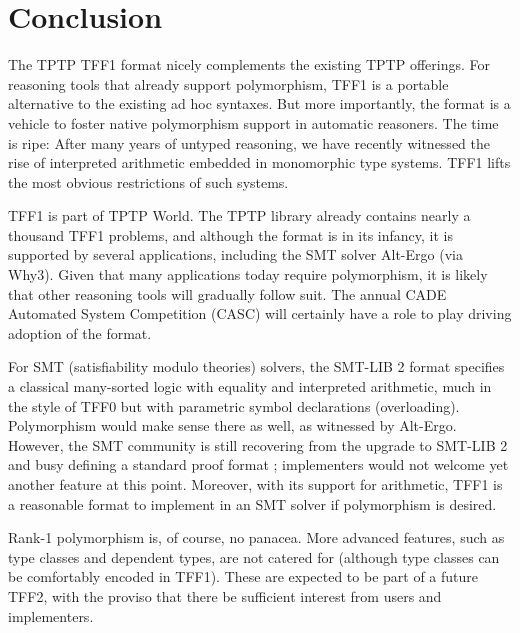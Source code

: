 \section{Conclusion}
\label{sec_concl}

The TPTP TFF1 format nicely complements the existing TPTP
offerings. %
For reasoning tools that already
support polymorphism, TFF1 is a portable alternative to the existing ad hoc
syntaxes. But more importantly, the format is a vehicle to foster native
polymorphism support in automatic reasoners.
The time is ripe: After many
years of untyped reasoning, we have recently witnessed the rise of
interpreted arithmetic embedded in monomorphic type systems. TFF1
lifts the most obvious restrictions of such systems.

TFF1 is part of TPTP World. The TPTP library already contains
nearly a thousand TFF1 problems, and although the format is in its
infancy, it is supported by several applications, including the SMT solver
Alt-Ergo (via Why3).
Given that many applications today require polymorphism, it
is likely that other reasoning tools will gradually follow suit.
The annual CADE Automated
System Competition (CASC) will certainly have a
role to play driving adoption of the format.

For SMT (satisfiability modulo theories) solvers, the SMT-LIB 2 format \cite{barrett-et-al-2010} specifies a
classical many-sorted logic with equality and interpreted arithmetic, much in
the style of TFF0 but with parametric symbol declarations (overloading).
Polymorphism would make sense there as well, as witnessed by Alt-Ergo.
However, the SMT community is still recovering from the %
upgrade to SMT-LIB 2 and busy defining a standard proof format
\cite{besson-et-al-2011}; implementers would %
not welcome yet another
feature at this point. Moreover, with its support for arithmetic, TFF1 is a
reasonable format to implement in an SMT solver if polymorphism is desired.

Rank-1 polymorphism is, of course, no panacea. More advanced features, such as
type classes and dependent types, are not catered for (although type
classes can be comfortably encoded in TFF1). These are expected to be
part of a future TFF2, with the proviso that there be sufficient interest from
users and implementers.

